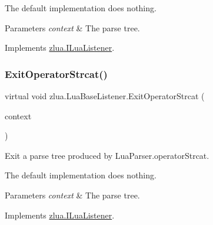 The default implementation does nothing.


\begin{DoxyParams}{Parameters}
{\em context} & The parse tree.\\
\hline
\end{DoxyParams}


Implements \mbox{\hyperlink{interfacezlua_1_1_i_lua_listener_a9047288a8f7ec003bff25c26b1d2984d}{zlua.\+I\+Lua\+Listener}}.

\mbox{\label{classzlua_1_1_lua_base_listener_a120cd0798009d1b1574ac0ec556482a7}} 
\subsubsection{\texorpdfstring{Exit\+Operator\+Strcat()}{ExitOperatorStrcat()}}
{\footnotesize\ttfamily virtual void zlua.\+Lua\+Base\+Listener.\+Exit\+Operator\+Strcat (\begin{DoxyParamCaption}\item[{\mbox{[}\+Not\+Null\mbox{]} \mbox{\hyperlink{classzlua_1_1_lua_parser_1_1_operator_strcat_context}{Lua\+Parser.\+Operator\+Strcat\+Context}}}]{context }\end{DoxyParamCaption})\hspace{0.3cm}{\ttfamily [virtual]}}



Exit a parse tree produced by Lua\+Parser.\+operator\+Strcat. 

The default implementation does nothing.


\begin{DoxyParams}{Parameters}
{\em context} & The parse tree.\\
\hline
\end{DoxyParams}


Implements \mbox{\hyperlink{interfacezlua_1_1_i_lua_listener_a9b0c6b0efb7d5c405477117f0df532fa}{zlua.\+I\+Lua\+Listener}}.

\mbox{\label{classzlua_1_1_lua_base_listener_a7c6d18b5d844f0af74c1123b245bc373}} 

